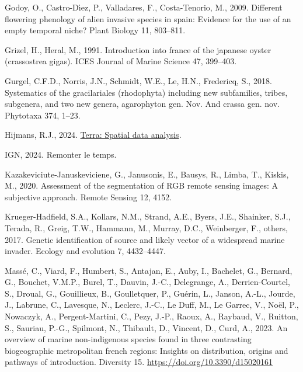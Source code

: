 \documentclass[
  letterpaper,
  DIV=11,
  numbers=noendperiod]{scrartcl}
\newlength{\cslhangindent}
\newenvironment{CSLReferences}[2] %
 {\begin{list}{}{%
  \setlength{\itemindent}{0pt}
  \setlength{\leftmargin}{0pt}
  \setlength{\parsep}{0pt}
  \ifodd #1
   \setlength{\leftmargin}{\cslhangindent}
   \setlength{\itemindent}{-1\cslhangindent}
  \fi
  \setlength{\itemsep}{#2\baselineskip}}}
 {\end{list}}
\begin{document}
\begin{CSLReferences}{1}{0}
Godoy, O., Castro-Dı́ez, P., Valladares, F., Costa-Tenorio, M., 2009.
Different flowering phenology of alien invasive species in spain:
Evidence for the use of an empty temporal niche? Plant Biology 11,
803--811.

Grizel, H., Heral, M., 1991. Introduction into france of the japanese
oyster (crassostrea gigas). ICES Journal of Marine Science 47, 399--403.

Gurgel, C.F.D., Norris, J.N., Schmidt, W.E., Le, H.N., Fredericq, S.,
2018. Systematics of the gracilariales (rhodophyta) including new
subfamilies, tribes, subgenera, and two new genera, agarophyton gen.
Nov. And crassa gen. nov. Phytotaxa 374, 1--23.

Hijmans, R.J., 2024.
\href{https://CRAN.R-project.org/package=terra}{Terra: Spatial data
analysis}.

IGN, 2024. Remonter le temps.

Kazakeviciute-Januskeviciene, G., Janusonis, E., Bausys, R., Limba, T.,
Kiskis, M., 2020. Assessment of the segmentation of RGB remote sensing
images: A subjective approach. Remote Sensing 12, 4152.

Krueger-Hadfield, S.A., Kollars, N.M., Strand, A.E., Byers, J.E.,
Shainker, S.J., Terada, R., Greig, T.W., Hammann, M., Murray, D.C.,
Weinberger, F., others, 2017. Genetic identification of source and
likely vector of a widespread marine invader. Ecology and evolution 7,
4432--4447.

Massé, C., Viard, F., Humbert, S., Antajan, E., Auby, I., Bachelet, G.,
Bernard, G., Bouchet, V.M.P., Burel, T., Dauvin, J.-C., Delegrange, A.,
Derrien-Courtel, S., Droual, G., Gouillieux, B., Goulletquer, P.,
Guérin, L., Janson, A.-L., Jourde, J., Labrune, C., Lavesque, N.,
Leclerc, J.-C., Le Duff, M., Le Garrec, V., Noël, P., Nowaczyk, A.,
Pergent-Martini, C., Pezy, J.-P., Raoux, A., Raybaud, V., Ruitton, S.,
Sauriau, P.-G., Spilmont, N., Thibault, D., Vincent, D., Curd, A., 2023.
An overview of marine non-indigenous species found in three contrasting
biogeographic metropolitan french regions: Insights on distribution,
origins and pathways of introduction. Diversity 15.
\url{https://doi.org/10.3390/d15020161}


\end{CSLReferences}
\end{document}
